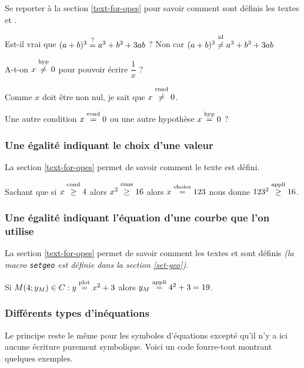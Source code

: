 \documentclass[12pt,a4paper]{article}
\newcommand\setgeo[1]{#1}
\begin{document}
Se reporter à la section \ref{text-for-opes} pour savoir comment sont définis les textes \emph{\og \textopcond \fg} et \emph{\og \textophyp \fg}.

\begin{tcblisting}{}
Est-il vrai que $(a + b)^3 \eqtest a^3 + b^3 + 3 a b$ ?
Non car $(a + b)^3 \neqid a^3 + b^3 + 3 a b$

A-t-on $x \neqhyp 0$ pour pouvoir écrire $\dfrac{1}{x}$ ?

Comme $x$ doit être non nul, je sait que $x \neqcond 0$.

Une autre condition $x \eqcond 0$ ou une autre hypothèse $x \eqhyp 0$ ?
\end{tcblisting}


\subsubsection{Une égalité indiquant le choix d'une valeur}

La section \ref{text-for-opes} permet de savoir comment le texte \emph{\og \textopchoice \fg} est défini.

\begin{tcblisting}{}
Sachant que si $x \geqcond 4$ alors $x^2 \geqcons 16$ alors $x \eqchoice 123$ nous
donne $123^2 \geqappli 16$.
\end{tcblisting}


\subsubsection{Une égalité indiquant l'équation d'une courbe que l'on utilise}

La section \ref{text-for-opes} permet de savoir comment les textes \emph{\og \textopplot \fg} et \emph{\og \textopappli \fg} sont définis \emph{(la macro \emph{\texttt{setgeo}} est définie dans la section \ref{set-geo})}.

\begin{tcblisting}{}
Si $M(4 ; y_M) \in \setgeo{C}: y \eqplot x^2 + 3$ alors $y_M \eqappli 4^2 + 3 = 19$.
\end{tcblisting}



\subsubsection{Différents types d'inéquations}

Le principe reste le même pour les symboles d'équations excepté qu'il n'y a ici aucune écriture purement symbolique. Voici un code \og fourre-tout \fg{} montrant quelques exemples.
\end{document}
